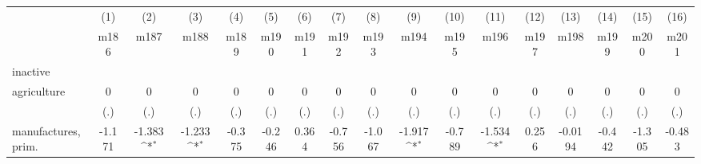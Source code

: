 {
\def\sym#1{\ifmmode^{#1}\else\(^{#1}\)\fi}
\begin{tabular}{l*{16}{c}}
\hline\hline
                    &\multicolumn{1}{c}{(1)}&\multicolumn{1}{c}{(2)}&\multicolumn{1}{c}{(3)}&\multicolumn{1}{c}{(4)}&\multicolumn{1}{c}{(5)}&\multicolumn{1}{c}{(6)}&\multicolumn{1}{c}{(7)}&\multicolumn{1}{c}{(8)}&\multicolumn{1}{c}{(9)}&\multicolumn{1}{c}{(10)}&\multicolumn{1}{c}{(11)}&\multicolumn{1}{c}{(12)}&\multicolumn{1}{c}{(13)}&\multicolumn{1}{c}{(14)}&\multicolumn{1}{c}{(15)}&\multicolumn{1}{c}{(16)}\\
                    &\multicolumn{1}{c}{m186}&\multicolumn{1}{c}{m187}&\multicolumn{1}{c}{m188}&\multicolumn{1}{c}{m189}&\multicolumn{1}{c}{m190}&\multicolumn{1}{c}{m191}&\multicolumn{1}{c}{m192}&\multicolumn{1}{c}{m193}&\multicolumn{1}{c}{m194}&\multicolumn{1}{c}{m195}&\multicolumn{1}{c}{m196}&\multicolumn{1}{c}{m197}&\multicolumn{1}{c}{m198}&\multicolumn{1}{c}{m199}&\multicolumn{1}{c}{m200}&\multicolumn{1}{c}{m201}\\
\hline
inactive            &                     &                     &                     &                     &                     &                     &                     &                     &                     &                     &                     &                     &                     &                     &                     &                     \\
agriculture         &           0         &           0         &           0         &           0         &           0         &           0         &           0         &           0         &           0         &           0         &           0         &           0         &           0         &           0         &           0         &           0         \\
                    &         (.)         &         (.)         &         (.)         &         (.)         &         (.)         &         (.)         &         (.)         &         (.)         &         (.)         &         (.)         &         (.)         &         (.)         &         (.)         &         (.)         &         (.)         &         (.)         \\
[1em]
manufactures, prim. &      -1.171         &      -1.383\sym{*}  &      -1.233\sym{*}  &      -0.375         &      -0.246         &       0.364         &      -0.756         &      -1.067         &      -1.917\sym{*}  &      -0.789         &      -1.534\sym{*}  &       0.256         &     -0.0194         &      -0.442         &      -1.305         &      -0.483         \\

\end{tabular}}
